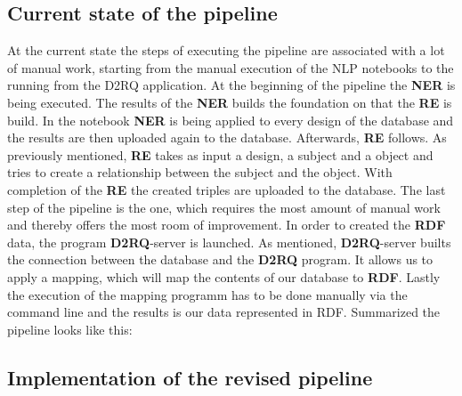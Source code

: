 \documentclass[12pt, oneside]{article}
\begin{document}
\subsection{Current state of the pipeline}
At the current state the steps of executing the pipeline are associated with a lot of manual work, starting from the manual execution of the NLP notebooks to the running from the D2RQ application. At the beginning of the pipeline the \textbf{NER} is being executed. The results of the \textbf{NER} builds the foundation on that the \textbf{RE} is build. In the notebook \textbf{NER} is being applied to every design of the database and the results are then uploaded again to the database. Afterwards, \textbf{RE} follows. As previously mentioned, \textbf{RE} takes as input a design, a subject and a object and tries to create a relationship between the subject and the object. With completion of the \textbf{RE} the created triples are uploaded to the database. The last step of the pipeline is the one, which requires the most amount of manual work and thereby offers the most room of improvement. In order to created the \textbf{RDF} data, the program \textbf{D2RQ}-server is launched. As mentioned, \textbf{D2RQ}-server builts the connection between the database and the \textbf{D2RQ} program. It allows us to apply a mapping, which will map the contents of our database to \textbf{RDF}. Lastly the execution of the mapping programm has to be done manually via the command line and the results is our data represented in RDF.
Summarized the pipeline looks like this:\\
\begin{center}
\end{center}

\subsection{Implementation of the revised pipeline}
\end{document}
